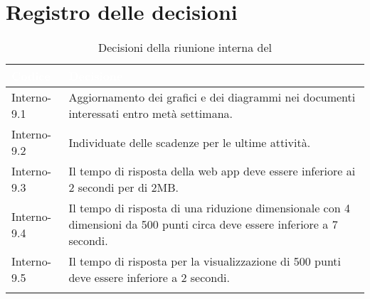 \section{Registro delle decisioni}
{
\renewcommand{\arraystretch}{1.5}
\centering
\begin{longtable}{C{3cm} C{9cm}}
\textcolor{white}{\textbf{Codice}}&
\textcolor{white}{\textbf{Decisione}}\\	

\endhead
		
Interno-9.1 & Aggiornamento dei grafici e dei diagrammi nei documenti interessati entro metà settimana.\\
Interno-9.2 & Individuate delle scadenze per le ultime attività.\\
Interno-9.3 & Il tempo di risposta della web app deve essere inferiore ai 2 secondi per  di 2MB.\\
Interno-9.4 & Il tempo di risposta di una riduzione dimensionale con 4 dimensioni da 500 punti circa deve essere inferiore a 7 secondi.\\
Interno-9.5 & Il tempo di risposta per la visualizzazione di 500 punti deve essere inferiore a 2 secondi.\\

\caption{Decisioni della riunione interna del \Data{}}
\end{longtable}
}

